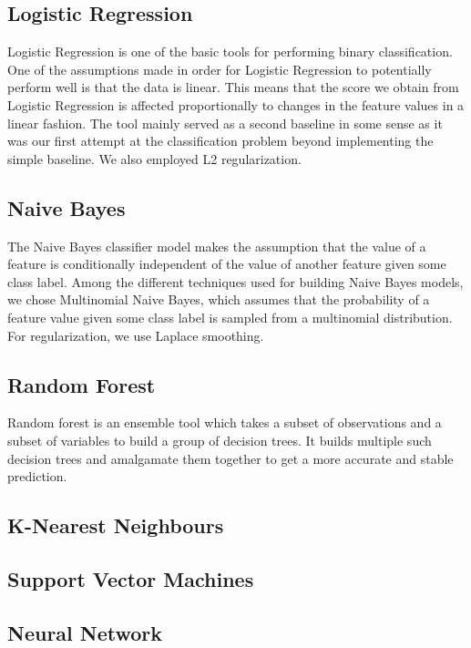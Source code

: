 \documentclass[12pt,a4paper,english]{amsart}
\begin{document}
\subsection*{Logistic Regression}

Logistic Regression is one of the basic tools for performing binary classification. One of the assumptions made in order for Logistic Regression to potentially perform well is that the data is linear. This means that the score we obtain from Logistic Regression is affected proportionally to changes in the feature values in a linear fashion. The tool mainly served as a second baseline in some sense as it was our first attempt at the classification problem beyond implementing   the   simple   baseline.   We   also   employed   L2   regularization.

\subsection*{Naive Bayes}

The Naive Bayes classifier model makes the assumption that the value of a feature is conditionally independent of the value of another feature given some class label. Among the different techniques used for building Naive Bayes models, we chose Multinomial Naive Bayes, which assumes that the probability of a feature value given some class label   is   sampled   from   a   multinomial   distribution.   For   regularization,   we   use   Laplace   smoothing.

\subsection*{Random Forest}

Random forest is an ensemble tool which takes a subset of observations and a subset of variables to build a group of decision trees. It builds multiple such decision trees and amalgamate them together to get a more accurate and stable prediction.

\subsection*{K-Nearest Neighbours}

\subsection*{Support Vector Machines}

\subsection*{Neural Network}
\end{document}
